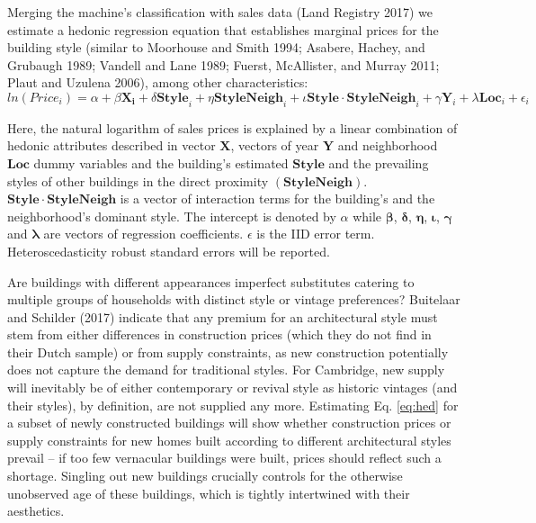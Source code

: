\documentclass[]{article}
\begin{document}
Merging the machine's classification with sales data (Land Registry
2017) we estimate a hedonic regression equation that establishes
marginal prices for the building style (similar to Moorhouse and Smith
1994; Asabere, Hachey, and Grubaugh 1989; Vandell and Lane 1989; Fuerst,
McAllister, and Murray 2011; Plaut and Uzulena 2006), among other
characteristics: \begin{equation} \label{eq:hed}
  ln(Price_i) = \alpha + \beta\mathbf{X_i} + \delta\mathbf{Style}_i + \eta\mathbf{StyleNeigh}_i + \iota\mathbf{Style\cdot StyleNeigh}_i  +\gamma\mathbf{Y}_i + \lambda\mathbf{Loc}_i +  \epsilon_i
\end{equation}

Here, the natural logarithm of sales prices is explained by a linear
combination of hedonic attributes described in vector \(\mathbf{X}\),
vectors of year \(\mathbf{Y}\) and neighborhood \(\bm{Loc}\) dummy
variables and the building's estimated \(\mathbf{Style}\) and the
prevailing styles of other buildings in the direct proximity
\((\mathbf{StyleNeigh})\). \(\mathbf{Style\cdot StyleNeigh}\) is a
vector of interaction terms for the building's and the neighborhood's
dominant style. The intercept is denoted by \(\alpha\) while
\(\bm{\beta}\), \(\bm{\delta}\), \(\bm{\eta}\), \(\bm{\iota}\),
\(\bm{\gamma}\) and \(\bm{\lambda}\) are vectors of regression
coefficients. \(\epsilon\) is the IID error term. Heteroscedasticity
robust standard errors will be reported.

Are buildings with different appearances imperfect substitutes catering
to multiple groups of households with distinct style or vintage
preferences? Buitelaar and Schilder (2017) indicate that any premium for
an architectural style must stem from either differences in construction
prices (which they do not find in their Dutch sample) or from supply
constraints, as new construction potentially does not capture the demand
for traditional styles. For Cambridge, new supply will inevitably be of
either contemporary or revival style as historic vintages (and their
styles), by definition, are not supplied any more. Estimating Eq.
\ref{eq:hed} for a subset of newly constructed buildings will show
whether construction prices or supply constraints for new homes built
according to different architectural styles prevail -- if too few
vernacular buildings were built, prices should reflect such a shortage.
Singling out new buildings crucially controls for the otherwise
unobserved age of these buildings, which is tightly intertwined with
their aesthetics.
\end{document}
